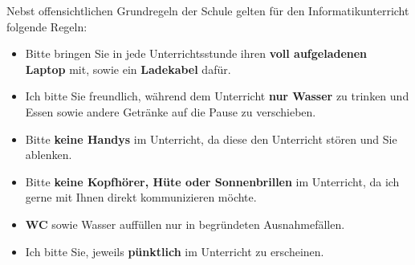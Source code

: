 Nebst offensichtlichen Grundregeln der Schule gelten für den Informatikunterricht folgende Regeln:

\begin{itemize}
	\item[\faLaptop] Bitte bringen Sie in jede Unterrichtsstunde ihren \textbf{voll aufgeladenen Laptop} mit, sowie ein \textbf{Ladekabel} dafür.
	\item[\faTint] Ich bitte Sie freundlich, während dem Unterricht \textbf{nur Wasser} zu trinken und Essen sowie andere Getränke auf die Pause zu verschieben.
	\item[\faMobile] Bitte \textbf{keine Handys} im Unterricht, da diese den Unterricht stören und Sie ablenken.
	\item[\faHeadphones] Bitte \textbf{keine Kopfhörer, Hüte oder Sonnenbrillen} im Unterricht, da ich gerne mit Ihnen direkt kommunizieren möchte.
	\item[\faRestroom] \textbf{WC} sowie Wasser auffüllen nur in begründeten Ausnahmefällen.
	\item[\faClock] Ich bitte Sie, jeweils \textbf{pünktlich} im Unterricht zu erscheinen.
\end{itemize}

\begin{notizTemplate}[title={Weitere, gemeinsam vereinbarte Grundwerte und Regeln}, height=5cm, colframe=FDUteal, colbacktitle=FDUteal]
	
\end{notizTemplate}

\begin{notizTemplate}[title={\emoji{pen} Unterschriften},height=7cm,colframe=FDUblue,colbacktitle=FDUblue]

\end{notizTemplate}


